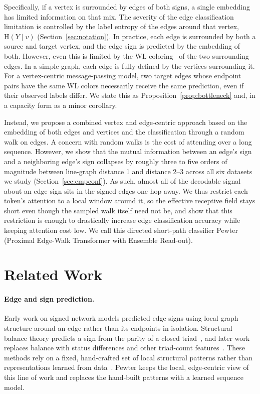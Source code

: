 \documentclass[sigconf, review, anonymous]{acmart}
\newcommand{\Hh}{\mathrm{H}}
\theoremstyle{plain}
\theoremstyle{definition}
\begin{document}
Specifically, if a vertex is surrounded by edges of both signs, a single embedding has limited information on that mix. The severity of the edge classification limitation is controlled by the label entropy of the edges around that vertex, $\Hh(Y\mid v)$ (Section~\ref{sec:notation}). In practice, each edge is surrounded by both a source and target vertex, and the edge sign is predicted by the embedding of both. However, even this is limited by the WL coloring~\citep{weisfeiler1968reduction} of the two surrounding edges.  In a simple graph, each edge is fully defined by the vertices surrounding it. For a vertex-centric message-passing model, two target edges whose
endpoint pairs have the same WL colors necessarily receive the same
prediction, even if their observed labels differ.  We state this as Proposition~\ref{prop:bottleneck} and, in a capacity form as a minor corollary. 

Instead, we propose a combined vertex and edge-centric approach based on the embedding of both edges and vertices and the classification through a random walk on edges. A concern with random walks is the cost of attending over a long sequence. However, we show that the mutual information between an edge's sign and a neighboring edge's sign collapses by roughly three to five orders of magnitude between line-graph distance 1 and distance 2--3 across all six datasets we study (Section~\ref{sec:empconf}). As such, almost all of the decodable signal about an edge sign sits in the signed edges one hop away. We thus restrict each token's attention to a local window around it, so the effective receptive field stays short even though the sampled walk itself need not be, and show that this restriction is enough to drastically increase edge classification accuracy while keeping attention cost low. We call this directed short-path classifier Pewter (Proximal Edge-Walk Transformer with Ensemble Read-out).


\section{Related Work}
\paragraph{Edge and sign prediction.} Early work on signed network models predicted edge signs using local graph structure around an edge rather than its endpoints in isolation. Structural balance theory predicts a sign from the parity of a closed triad~\citep{cartwright1956structural}, and later work replaces balance with status differences and other triad-count features~\citep{leskovec2010predicting}. These methods rely on a fixed, hand-crafted set of local structural patterns rather than representations learned from data~\citep{naaman2019edge}. Pewter keeps the local, edge-centric view of this line of work and replaces the hand-built patterns with a learned sequence model.
\end{document}
